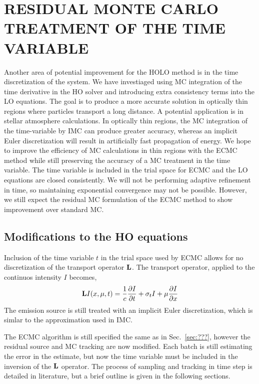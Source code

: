 
\chapter{ \uppercase {Residual Monte Carlo Treatment of the Time Variable}}
\label{sec:time}
Another area of potential improvement for the HOLO method is in the time discretization
of the system.  We have investiaged using MC integration of the time derivative in the HO
solver and introducing extra consistency terms into the LO equations.  The goal is to produce a more accurate solution in optically
thin regions where particles transport a long distance.  A potential application is in 
stellar atmosphere calculations.  In optically thin regions, the MC
integration of the time-variable by IMC can produce greater accuracy, whereas an implicit
Euler discretization will result in artificially fast propagation of energy.  We hope to improve
the efficiency of MC calculations in thin regions with the ECMC method while still preserving the
accuracy of a MC treatment in the time variable.  The time variable is included in
the trial space for ECMC and the LO equations are closed consistently.  We
will not be performing adaptive refinement in time, so maintaining exponential convergence
may not be possible.  However, we still expect the residual MC formulation of the ECMC method
to show improvement over standard MC.

\section{Modifications to the HO equations}
\label{sec:time_ho}

Inclusion of the time variable $t$ in the trial space used by ECMC allows for no discretization of the
transport operator $\mathbf{L}$.  The transport operator, applied to the continuos intensity $I$
becomes,
\begin{equation}
   \mathbf{L}I(x,\mu,t) = \frac{1}{c}\frac{\partial I}{\partial t} + \sigma_t I + \mu \frac{\partial I}{\partial x}
\end{equation}
The emission source is still treated with an implicit Euler discretization, which is
simlar to the approximation used in IMC. 

The ECMC algorithm is still specified the same as in Sec.~\ref{sec:???}, however the residual
source and MC tracking are now modified.   Each batch is still estimating the error in the
estimate, but now the time variable must be included in the inversion of the $\mathbf{L}$
operator.  The process of sampling and tracking in time
step is detailed in literature\cite{wollaber_review,fnc,wollaber_thesis,cj_thesis}, but a
brief outline is given in the following sections. 

